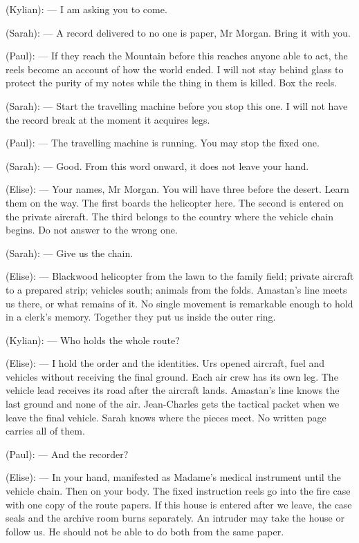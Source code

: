 \begin{room}
(Kylian): --- I am asking you to come.

(Sarah): --- A record delivered to no one is paper, Mr Morgan. Bring it with you.

(Paul): --- If they reach the Mountain before this reaches anyone able to act, the reels become an account of how the world ended. I will not stay behind glass to protect the purity of my notes while the thing in them is killed. Box the reels.

(Sarah): --- Start the travelling machine before you stop this one. I will not have the record break at the moment it acquires legs.

(Paul): --- The travelling machine is running. You may stop the fixed one.

(Sarah): --- Good. From this word onward, it does not leave your hand.

\centerline{}

(Elise): --- Your names, Mr Morgan. You will have three before the desert. Learn them on the way. The first boards the helicopter here. The second is entered on the private aircraft. The third belongs to the country where the vehicle chain begins. Do not answer to the wrong one.

(Sarah): --- Give us the chain.

(Elise): --- Blackwood helicopter from the lawn to the family field; private aircraft to a prepared strip; vehicles south; animals from the folds. Amastan's line meets us there, or what remains of it. No single movement is remarkable enough to hold in a clerk's memory. Together they put us inside the outer ring.

(Kylian): --- Who holds the whole route?

(Elise): --- I hold the order and the identities. Urs opened aircraft, fuel and vehicles without receiving the final ground. Each air crew has its own leg. The vehicle lead receives its road after the aircraft lands. Amastan's line knows the last ground and none of the air. Jean-Charles gets the tactical packet when we leave the final vehicle. Sarah knows where the pieces meet. No written page carries all of them.

(Paul): --- And the recorder?

(Elise): --- In your hand, manifested as Madame's medical instrument until the vehicle chain. Then on your body. The fixed instruction reels go into the fire case with one copy of the route papers. If this house is entered after we leave, the case seals and the archive room burns separately. An intruder may take the house or follow us. He should not be able to do both from the same paper.


\end{room}
